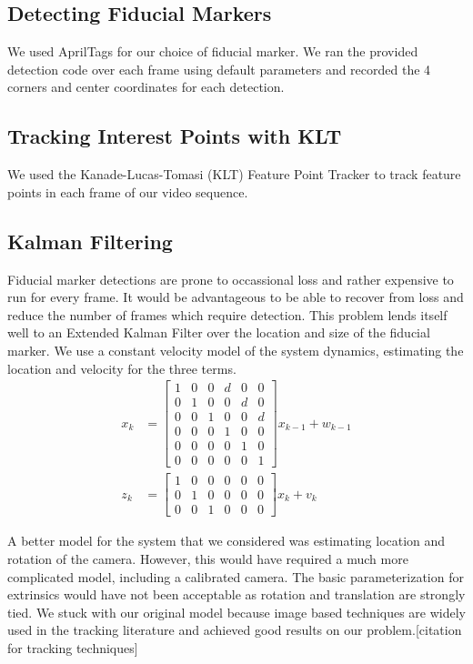 \documentclass[12pt]{article}
\begin{document}
\subsection{Detecting Fiducial Markers}
We used AprilTags \cite{Olson2011} for our choice of fiducial marker. We ran the provided detection code over each frame using default parameters and recorded the 4 corners and center coordinates for each detection.

\subsection{Tracking Interest Points with KLT}
We used the Kanade-Lucas-Tomasi (KLT) Feature Point Tracker \cite{Lucas1981,Tomasi1991,Shi1994} to track feature points in each frame of our video sequence.

\subsection{Kalman Filtering}
Fiducial marker detections are prone to occassional loss and rather expensive to run for every frame.  It would be advantageous to be able to recover from loss and reduce the number of frames which require detection.  This problem lends itself well to an Extended Kalman Filter over the location and size of the fiducial marker.  We use a constant velocity model of the system dynamics, estimating the location and velocity for the three terms.  
\begin{align}
x_k &= \left[ \begin{array}{cccccc} 
1 & 0 & 0 & d & 0 & 0 \\
0 & 1 & 0 & 0 & d & 0 \\
0 & 0 & 1 & 0 & 0 & d \\
0 & 0 & 0 & 1 & 0 & 0\\
0 & 0 & 0 & 0 & 1 & 0\\
0 & 0 & 0 & 0 & 0 & 1
\end{array}\right] x_{k-1} + w_{k-1}\\
z_k &= \left[ \begin{array}{cccccc}
1 & 0 & 0 & 0 & 0 & 0\\
0 & 1 & 0 & 0 & 0 & 0\\
0 & 0 & 1 & 0 & 0 & 0\end{array}\right] x_k + v_{k}
\end{align}

A better model for the system that we considered was estimating location and rotation of the camera.  However, this would have required a much more complicated model, including a calibrated camera.  The basic parameterization for extrinsics would have not been acceptable as rotation and translation are strongly tied.  We stuck with our original model because image based techniques are widely used in the tracking literature and achieved good results on our problem.[citation for tracking techniques]
\end{document}
